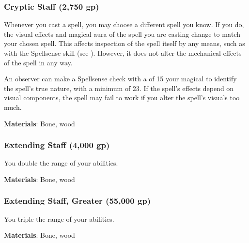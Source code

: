 
\lowercase{\hypertarget{item:Cryptic Staff}{}}\label{item:Cryptic Staff}
\hypertarget{item:Cryptic Staff}{\subsubsection{Cryptic Staff\hfill{} (2,750 gp)}}

Whenever you cast a spell, you may choose a different spell you know.
If you do, the visual effects and magical aura of the spell you are casting change to match your chosen spell.
This affects inspection of the spell itself by any means, such as with the Spellsense skill (see ).
However, it does not alter the mechanical effects of the spell in any way.

An observer can make a Spellsense check with a  of 15 \add your magical  to identify the spell's true nature, with a minimum  of 23.
If the spell's effects depend on visual components, the spell may fail to work if you alter the spell's visuals too much.



\vspace{0.25em}
\textbf{Materials}: Bone, wood


\lowercase{\hypertarget{item:Extending Staff}{}}\label{item:Extending Staff}
\hypertarget{item:Extending Staff}{\subsubsection{Extending Staff\hfill{} (4,000 gp)}}

You double the range of your  abilities.



\vspace{0.25em}
\textbf{Materials}: Bone, wood


\lowercase{\hypertarget{item:Extending Staff, Greater}{}}\label{item:Extending Staff, Greater}
\hypertarget{item:Extending Staff, Greater}{\subsubsection{Extending Staff, Greater\hfill{} (55,000 gp)}}

You triple the range of your  abilities.



\vspace{0.25em}
\textbf{Materials}: Bone, wood


